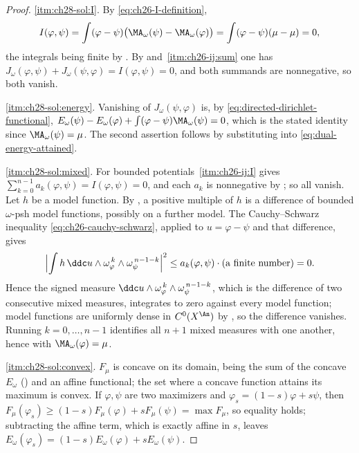 \begin{proof}
\cref{itm:ch28-sol:I}.  By \eqref{eq:ch26-I-definition},
\[
 I(\varphi,\psi)=\int(\varphi-\psi)
   \bigl(\MA_\omega(\psi)-\MA_\omega(\varphi)\bigr)
 =\int(\varphi-\psi)(\mu-\mu)=0 ,
\]
the integrals being finite by .  By
 and
\,\cref{itm:ch26-ij:sum} one has
$J_\omega(\varphi,\psi)+J_\omega(\psi,\varphi)=I(\varphi,\psi)=0$, and
both summands are nonnegative, so both vanish.

\cref{itm:ch28-sol:energy}.  Vanishing of $J_\omega(\psi,\varphi)$ is,
by \eqref{eq:directed-dirichlet-functional},
$E_\omega(\psi)-E_\omega(\varphi)+\int(\varphi-\psi)\MA_\omega(\psi)=0$,
which is the stated identity since $\MA_\omega(\psi)=\mu$.  The second
assertion follows by substituting into \eqref{eq:dual-energy-attained}.

\cref{itm:ch28-sol:mixed}.  For bounded potentials
\,\cref{itm:ch26-ij:I} gives
$\sum_{k=0}^{n-1}a_k(\varphi,\psi)=I(\varphi,\psi)=0$, and each $a_k$ is
nonnegative by ; so all vanish.  Let
$h$ be a model function.  By
\cite[Corollary~1.13]{BJ25FiniteEnergy}, a positive multiple of $h$ is
a difference of bounded $\omega$-psh model functions, possibly on a
further model.  The Cauchy--Schwarz inequality
\eqref{eq:ch26-cauchy-schwarz}, applied to $u=\varphi-\psi$ and that
difference, gives
\[
 \Bigl|\int h\,\ddc u\wedge
   \omega_\varphi^{\,k}\wedge\omega_\psi^{\,n-1-k}\Bigr|^2
 \leq a_k(\varphi,\psi)\cdot(\text{a finite number})=0 .
\]
Hence the signed measure
$\ddc u\wedge\omega_\varphi^{\,k}\wedge\omega_\psi^{\,n-1-k}$, which is
the difference of two consecutive mixed measures, integrates to zero against
every model function; model functions are uniformly dense in
$C^0(X^{\An})$ by , so the difference vanishes.
Running $k=0,\ldots,n-1$ identifies all $n+1$ mixed measures with one
another, hence with $\MA_\omega(\varphi)=\mu$.

\cref{itm:ch28-sol:convex}.  $F_\mu$ is concave on its domain, being the
sum of the concave $E_\omega$ () and an
affine functional; the set where a concave function attains its maximum is
convex.  If $\varphi,\psi$ are two maximizers and
$\varphi_s=(1-s)\varphi+s\psi$, then
$F_\mu(\varphi_s)\geq(1-s)F_\mu(\varphi)+sF_\mu(\psi)=\max F_\mu$, so
equality holds; subtracting the affine term, which is exactly affine in
$s$, leaves
$E_\omega(\varphi_s)=(1-s)E_\omega(\varphi)+sE_\omega(\psi)$.


\end{proof}
